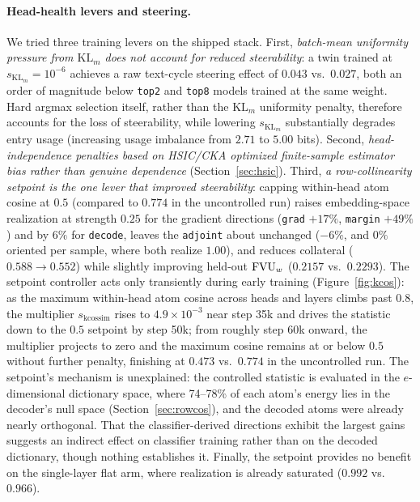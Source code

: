 \paragraph{Head-health levers and steering.} We tried three training
levers on the shipped stack. First, \emph{batch-mean uniformity pressure from
$\mathrm{KL}_m$ does not account for reduced steerability}: a twin
trained at $s_{\mathrm{KL}_m}{=}10^{-6}$ achieves a raw text-cycle
steering effect of $0.043$ vs.\ $0.027$, both an order of magnitude below
\texttt{top2} and \texttt{top8} models trained at the same weight. Hard
argmax selection itself, rather than the $\mathrm{KL}_m$ uniformity
penalty, therefore accounts for the loss of steerability, while lowering
$s_{\mathrm{KL}_m}$ substantially degrades entry usage (increasing usage
imbalance from $2.71$ to $5.00$ bits). Second, \emph{head-independence
penalties based on HSIC/CKA optimized finite-sample estimator bias rather
than genuine dependence} (Section~\ref{sec:hsic}). Third, \emph{a
row-collinearity setpoint is the one lever that improved steerability}: capping
within-head atom cosine at $0.5$ (compared to $0.774$ in the uncontrolled
run) raises embedding-space realization at strength $0.25$ for the
gradient directions (\texttt{grad} $+17\%$, \texttt{margin} $+49\%$) and
by $6\%$ for \texttt{decode}, leaves the \texttt{adjoint} about unchanged
($-6\%$, and $0\%$ oriented per sample, where both realize $1.00$), and reduces collateral
($0.588 \to 0.552$) while slightly improving held-out $\mathrm{FVU}_w$ ($0.2157$ vs.\
$0.2293$). The setpoint controller acts only transiently during early
training (Figure~\ref{fig:kcos}): as the maximum within-head atom cosine
across heads and layers climbs past $0.8$, the multiplier
$s_{\mathrm{kcossim}}$ rises to $4.9\times10^{-3}$ near step 35k and
drives the statistic down to the $0.5$ setpoint by step 50k; from roughly
step 60k onward, the multiplier projects to zero and the maximum cosine
remains at or below $0.5$ without further penalty, finishing at $0.473$
vs.\ $0.774$ in the uncontrolled run. The setpoint's mechanism is
unexplained: the controlled statistic is evaluated in
the $e$-dimensional dictionary space, where 74--78\% of each atom's
energy lies in the decoder's null space (Section~\ref{sec:rowcos}), and
the decoded atoms were already nearly orthogonal. That the
classifier-derived directions exhibit the largest gains suggests an
indirect effect on classifier training rather than on the decoded
dictionary, though nothing establishes it. Finally,
the setpoint provides no benefit on the single-layer flat arm, where
realization is already saturated ($0.992$ vs.\ $0.966$).

